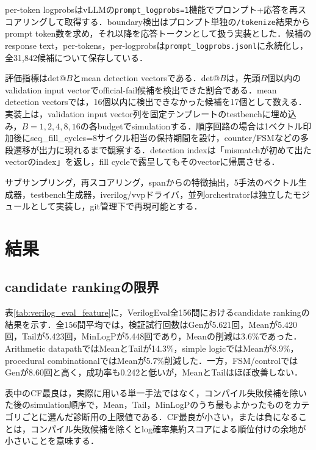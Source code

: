 \documentclass[submit,techrep,noauthor]{ipsj}
\begin{document}
per-token logprobsはvLLMの\texttt{prompt\_logprobs=1}機能でプロンプト+応答を再スコアリングして取得する．boundary検出はプロンプト単独の\texttt{/tokenize}結果からprompt token数を求め，それ以降を応答トークンとして扱う実装とした．候補のresponse text，per-tokens，per-logprobsは\texttt{prompt\_logprobs.jsonl}に永続化し，全31,842候補について保存している．

評価指標はdet@$B$とmean detection vectorsである．det@$B$は，先頭$B$個以内のvalidation input vectorでofficial-fail候補を検出できた割合である．mean detection vectorsでは，16個以内に検出できなかった候補を17個として数える．実装上は，validation input vector列を固定テンプレートのtestbenchに埋め込み，$B=1,2,4,8,16$の各budgetでsimulationする．順序回路の場合は1ベクトル印加後にseq\_fill\_cycles=8サイクル相当の保持期間を設け，counter/FSMなどの多段遷移が出力に現れるまで観察する．detection indexは「mismatchが初めて出たvectorのindex」を返し，fill cycleで露呈してもそのvectorに帰属させる．

サブサンプリング，再スコアリング，spanからの特徴抽出，5手法のベクトル生成器，testbench生成器，iverilog/vvpドライバ，並列orchestratorは独立したモジュールとして実装し，git管理下で再現可能とする．

\section{結果}\label{sec:results}

\subsection{candidate rankingの限界}



表\ref{tab:verilog_eval_feature}に，VerilogEval全156問におけるcandidate rankingの結果を示す．全156問平均では，検証試行回数はGenが5.621回，Meanが5.420回，Tailが5.423回，MinLogPが5.448回であり，Meanの削減は3.6\%であった．Arithmetic datapathではMeanとTailが14.3\%，simple logicではMeanが8.9\%，procedural combinationalではMeanが5.7\%削減した．一方，FSM/controlではGenが8.60回と高く，成功率も0.242と低いが，MeanとTailはほぼ改善しない．

表中のCF最良は，実際に用いる単一手法ではなく，コンパイル失敗候補を除いた後のsimulation順序で，Mean，Tail，MinLogPのうち最もよかったものをカテゴリごとに選んだ診断用の上限値である．CF最良が小さい，または負になることは，コンパイル失敗候補を除くとlog確率集約スコアによる順位付けの余地が小さいことを意味する．
\end{document}
